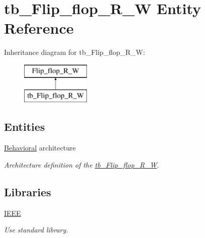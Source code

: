 \hypertarget{classtb___flip__flop___r___w}{}\section{tb\+\_\+\+Flip\+\_\+flop\+\_\+\+R\+\_\+W Entity Reference}
\label{classtb___flip__flop___r___w}
Inheritance diagram for tb\+\_\+\+Flip\+\_\+flop\+\_\+\+R\+\_\+W\+:\begin{figure}[H]
\begin{center}
\leavevmode
\includegraphics[height=2.000000cm]{classtb___flip__flop___r___w}
\end{center}
\end{figure}
\subsection*{Entities}
\begin{DoxyCompactItemize}
\item 
\hyperlink{classtb___flip__flop___r___w_1_1_behavioral}{Behavioral} architecture
\begin{DoxyCompactList}\small\item\em Architecture definition of the \hyperlink{classtb___flip__flop___r___w}{tb\+\_\+\+Flip\+\_\+flop\+\_\+\+R\+\_\+W}. \end{DoxyCompactList}\end{DoxyCompactItemize}
\subsection*{Libraries}
 \begin{DoxyCompactItemize}
\item 
\hyperlink{classtb___flip__flop___r___w_ae4f03c286607f3181e16b9aa12d0c6d4}{I\+E\+EE} \hypertarget{classtb___flip__flop___r___w_ae4f03c286607f3181e16b9aa12d0c6d4}{}\label{classtb___flip__flop___r___w_ae4f03c286607f3181e16b9aa12d0c6d4}

\begin{DoxyCompactList}\small\item\em Use standard library. \end{DoxyCompactList}\end{DoxyCompactItemize}
